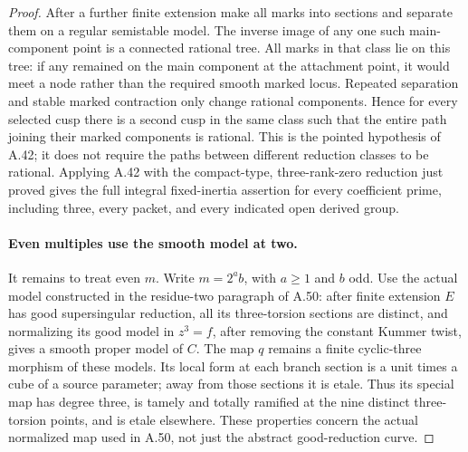 \begin{proof}
After a further finite extension make all marks into sections and
separate them on a regular semistable model. The inverse image of
any one such main-component point is a connected rational tree.
All marks in that class lie on this tree: if any remained on the
main component at the attachment point, it would meet a node rather
than the required smooth marked locus. Repeated separation and stable
marked contraction only change rational components. Hence for every
selected cusp there is a second cusp in the same class such that
the entire path joining their marked components is rational. This
is the pointed hypothesis of A.42; it does not require the paths
between different reduction classes to be rational. Applying A.42
with the compact-type, three-rank-zero reduction just proved gives
the full integral fixed-inertia assertion for every coefficient prime,
including three, every packet, and every indicated open derived group.

\paragraph{Even multiples use the smooth model at two.}
It remains to treat even \(m\). Write \(m=2^a b\), with \(a\ge1\)
and \(b\) odd. Use the actual model constructed in the residue-two
paragraph of A.50: after finite extension \(E\) has good supersingular
reduction, all its three-torsion sections are distinct, and normalizing
its good model in \(z^3=f\), after removing the constant Kummer twist,
gives a smooth proper model of \(C\). The map \(q\) remains a finite
cyclic-three morphism of these models. Its local form at each branch
section is a unit times a cube of a source parameter; away from those
sections it is etale. Thus its special map has degree three, is tamely
and totally ramified at the nine distinct three-torsion points, and
is etale elsewhere. These properties concern the actual normalized
map used in A.50, not just the abstract good-reduction curve.


\end{proof}
